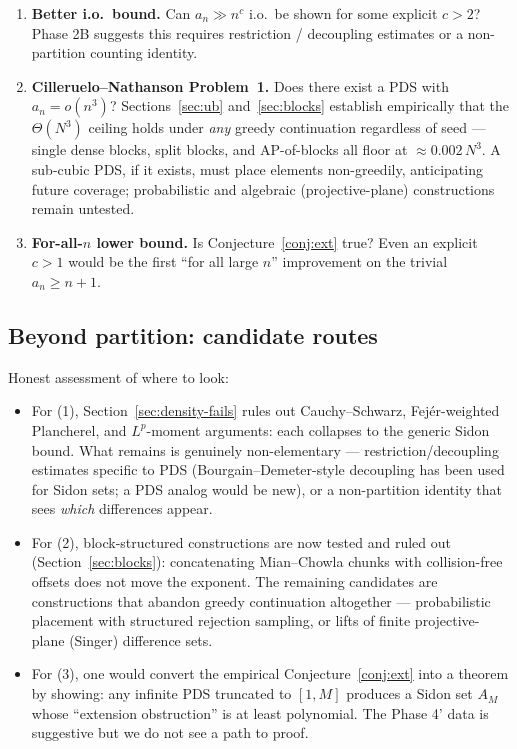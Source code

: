 \documentclass[11pt]{article}
\begin{document}
\begin{enumerate}
\item \textbf{Better i.o.\ bound.} Can $a_n \gg n^c$ i.o.\ be shown for
      some explicit $c > 2$? Phase 2B suggests this requires
      restriction / decoupling estimates or a non-partition counting
      identity.

\item \textbf{Cilleruelo--Nathanson Problem~1.} Does there exist a PDS
      with $a_n = o(n^3)$? Sections~\ref{sec:ub} and~\ref{sec:blocks}
      establish empirically that the $\Theta(N^3)$ ceiling holds under
      \emph{any} greedy continuation regardless of seed --- single dense
      blocks, split blocks, and AP-of-blocks all floor at
      $\approx 0.002\,N^3$. A sub-cubic PDS, if it exists, must place
      elements non-greedily, anticipating future coverage; probabilistic
      and algebraic (projective-plane) constructions remain untested.

\item \textbf{For-all-$n$ lower bound.} Is Conjecture~\ref{conj:ext}
      true? Even an explicit $c > 1$ would be the first ``for all
      large $n$'' improvement on the trivial $a_n \geq n + 1$.
\end{enumerate}

\subsection{Beyond partition: candidate routes}

Honest assessment of where to look:
\begin{itemize}
\item For (1), Section~\ref{sec:density-fails} rules out Cauchy--Schwarz,
      Fej\'er-weighted Plancherel, and $L^p$-moment arguments: each
      collapses to the generic Sidon bound. What remains is genuinely
      non-elementary --- restriction/decoupling estimates specific to PDS
      (Bourgain--Demeter-style decoupling has been used for Sidon sets;
      a PDS analog would be new), or a non-partition identity that sees
      \emph{which} differences appear.

\item For (2), block-structured constructions are now tested and ruled
      out (Section~\ref{sec:blocks}): concatenating Mian--Chowla chunks
      with collision-free offsets does not move the exponent. The
      remaining candidates are constructions that abandon greedy
      continuation altogether --- probabilistic placement with structured
      rejection sampling, or lifts of finite projective-plane (Singer)
      difference sets.

\item For (3), one would convert the empirical
      Conjecture~\ref{conj:ext} into a theorem by showing: any infinite
      PDS truncated to $[1, M]$ produces a Sidon set $A_M$ whose
      ``extension obstruction'' is at least polynomial. The Phase 4'
      data is suggestive but we do not see a path to proof.
\end{itemize}
\end{document}
